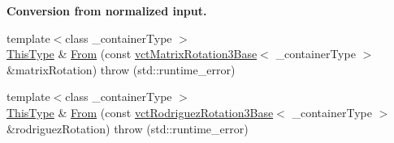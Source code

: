 \begin{Indent}{\bf Conversion from normalized input.}
\begin{DoxyCompactItemize}
\item 
{\footnotesize template$<$class \-\_\-container\-Type $>$ }\\\hyperlink{classvct_axis_angle_rotation3_af654a8037b7b82a378f69cb1bfd9b8dd}{This\-Type} \& \hyperlink{classvct_axis_angle_rotation3_a3466260e181f02ad123b838497643dba}{From} (const \hyperlink{classvct_matrix_rotation3_base}{vct\-Matrix\-Rotation3\-Base}$<$ \-\_\-container\-Type $>$ \&matrix\-Rotation)  throw (std\-::runtime\-\_\-error)
\item 
{\footnotesize template$<$class \-\_\-container\-Type $>$ }\\\hyperlink{classvct_axis_angle_rotation3_af654a8037b7b82a378f69cb1bfd9b8dd}{This\-Type} \& \hyperlink{classvct_axis_angle_rotation3_a024f33bed744a3c73469580a5de27555}{From} (const \hyperlink{classvct_rodriguez_rotation3_base}{vct\-Rodriguez\-Rotation3\-Base}$<$ \-\_\-container\-Type $>$ \&rodriguez\-Rotation)  throw (std\-::runtime\-\_\-error)
\end{DoxyCompactItemize}
\end{Indent}
